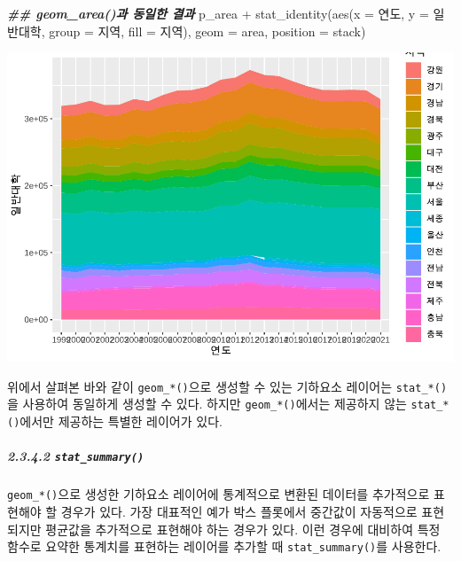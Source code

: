 \documentclass[
]{article}
\newenvironment{Shaded}{\begin{snugshade}}{\end{snugshade}}
\newcommand{\AttributeTok}[1]{\textcolor[rgb]{0.77,0.63,0.00}{#1}}
\newcommand{\DocumentationTok}[1]{\textcolor[rgb]{0.56,0.35,0.01}{\textbf{\textit{#1}}}}
\newcommand{\FunctionTok}[1]{\textcolor[rgb]{0.00,0.00,0.00}{#1}}
\newcommand{\NormalTok}[1]{#1}
\newcommand{\SpecialCharTok}[1]{\textcolor[rgb]{0.00,0.00,0.00}{#1}}
\newcommand{\StringTok}[1]{\textcolor[rgb]{0.31,0.60,0.02}{#1}}
\begin{document}
\begin{Shaded}
\begin{Highlighting}[]
\DocumentationTok{\#\# geom\_area()과 동일한 결과}
\NormalTok{p\_area }\SpecialCharTok{+} 
  \FunctionTok{stat\_identity}\NormalTok{(}\FunctionTok{aes}\NormalTok{(}\AttributeTok{x =}\NormalTok{ 연도, }\AttributeTok{y =}\NormalTok{ 일반대학, }\AttributeTok{group =}\NormalTok{ 지역, }\AttributeTok{fill =}\NormalTok{ 지역), }\AttributeTok{geom =} \StringTok{\textquotesingle{}area\textquotesingle{}}\NormalTok{, }\AttributeTok{position =} \StringTok{\textquotesingle{}stack\textquotesingle{}}\NormalTok{)}
\end{Highlighting}
\end{Shaded}

\includegraphics{chap3_files/figure-latex/unnamed-chunk-51-12.pdf}

위에서 살펴본 바와 같이 \texttt{geom\_*()}으로 생성할 수 있는 기하요소 레이어는 \texttt{stat\_*()}을 사용하여 동일하게 생성할 수 있다. 하지만 \texttt{geom\_*()}에서는 제공하지 않는 \texttt{stat\_*()}에서만 제공하는 특별한 레이어가 있다.

\hypertarget{stat_summary}{%
\subparagraph{\texorpdfstring{2.3.4.2 \texttt{stat\_summary()}}{2.3.4.2 stat\_summary()}}\label{stat_summary}}

\texttt{geom\_*()}으로 생성한 기하요소 레이어에 통계적으로 변환된 데이터를 추가적으로 표현해야 할 경우가 있다. 가장 대표적인 예가 박스 플롯에서 중간값이 자동적으로 표현되지만 평균값을 추가적으로 표현해야 하는 경우가 있다. 이런 경우에 대비하여 특정 함수로 요약한 통계치를 표현하는 레이어를 추가할 때 \texttt{stat\_summary()}를 사용한다.
\end{document}

